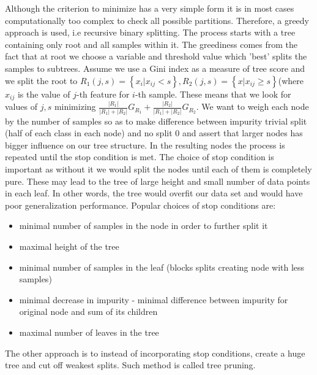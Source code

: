 \documentclass[shortabstract, english, mgr]{iithesis}
\begin{document}
Although the criterion to minimize has a very simple form it is in most cases computationally too complex to check all possible partitions. Therefore, a greedy approach is used, i.e recursive binary splitting. The process starts with a tree containing only root and all samples within it. The greediness comes from the fact that at root we choose a variable and threshold value which 'best' splits the samples to subtrees. Assume we use a Gini index as a measure of tree score and we split the root to $R_1(j, s) = \left\{x_i| x_{ij} < s \right\}, R_2(j, s) = \left\{x| x_{ij} \geq s \right\}$(where $x_{ij}$ is the value of $j$-th feature for $i$-th sample. These means that we look for values of $j,s$ minimizing $\frac{|R_1|}{|R_1|+|R_2|}G_{R_1} + \frac{|R_2|}{|R_1|+|R_2|}G_{R_2}$. We want to weigh each node by the number of samples so as to make difference between impurity trivial split (half of each class in each node) and no split $0$ and assert that larger nodes has bigger influence on our tree structure. In the resulting nodes the process is repeated until the stop condition is met. The choice of stop condition is important as without it we would split the nodes until each of them is completely pure. These may lead to the tree of large height and small number of data points in each leaf. In other words, the tree would overfit our data set and would have poor generalization performance. Popular choices of stop conditions are:
\begin{itemize}
    \item minimal number of samples in the node in order to further split it
    \item maximal height of the tree
    \item minimal number of samples in the leaf (blocks splits creating node with less samples)
    \item minimal decrease in impurity - minimal difference between impurity for original node and sum of its children
    \item maximal number of leaves in the tree
\end{itemize}

The other approach is to instead of incorporating stop conditions, create a huge tree and cut off weakest splits. Such method is called tree pruning. 
\end{document}
